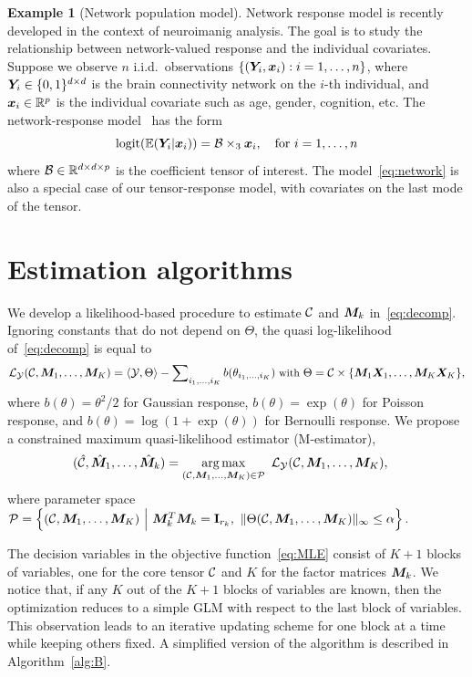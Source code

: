 \documentclass{article}
\theoremstyle{definition}
\theoremstyle{definition}
\newtheorem{example}{Example}
\begin{document}
\begin{example}[Network population model] 
Network response model is recently developed in the context of neuroimanig analysis. The goal is to study the relationship between network-valued response and the individual covariates. Suppose we observe $n$ i.i.d.\ observations $\{(\bm Y_i, \bm x_i): i=1,\ldots,n\}$, where $\bm Y_i\in\{0,1\}^{d\times d}$ is the brain connectivity network on the $i$-th individual, and $\bm x_i\in\mathbb{R}^p$ is the individual covariate such as age, gender, cognition, etc. The network-response model~\citep{rabusseau2016low} has the form
\begin{equation}\label{eq:network}
\text{logit}(\mathbb{E}(\bm Y_i|\bm x_i))=\mathcal{B}\times_3\bm x_i, \quad \text{for }i=1,\ldots,n
\end{equation}
where $\mathcal{B}\in \mathbb{R}^{d\times d\times p}$ is the coefficient tensor of interest. The model~\eqref{eq:network} is also a special case of our tensor-response model, with covariates on the last mode of the tensor. 
\end{example}

\section{Estimation algorithms}
We develop a likelihood-based procedure to estimate $\mathcal{C}$ and $\bm M_k$ in~\eqref{eq:decomp}. Ignoring constants that do not depend on $\Theta$, the quasi log-likelihood of~\eqref{eq:decomp} is equal to
\begin{equation}\label{eq:loglikelihood}
\small
\tL_{\tY}(\tC,\mM_1,\ldots,\mM_K)=\langle \tY, \Theta \rangle - \sum\nolimits_{i_1,\ldots,i_K} b(\theta_{i_1,\ldots,i_K})\ \text{with}\ \Theta=\tC\times\{\mM_1\mX_1,\ldots,\mM_K\mX_K\},
\end{equation}
where $b(\theta)=\theta^2/2$ for Gaussian response, $b(\theta)=\exp(\theta)$ for Poisson response, and $b(\theta)=\log(1+\exp(\theta))$ for Bernoulli response. We propose a constrained maximum quasi-likelihood estimator (M-estimator),
\begin{align} \label{eq:MLE} 
(\hat \tC, \hat \mM_1,\ldots,\hat \mM_k) &=\argmax_{(\tC,\mM_1,\ldots,\mM_K)\in \tP} \ \tL_{\tY}(\tC,\mM_1,\ldots,\mM_K),
\end{align}
where parameter space 
$
\tP=\left\{(\tC, \mM_1,\ldots,\mM_K) \ \Big| \ \mM_k^T\mM_k=\mathbf{I}_{r_k},\ \mnormSize{}{\Theta(\tC,\mM_1,\ldots,\mM_K)}\leq \alpha \right\}.
$


The decision variables in the objective function~\eqref{eq:MLE} consist of $K+1$ blocks of variables, one for the core tensor $\mathcal{C}$ and $K$ for the factor matrices $\bm M_k$. We notice that, if any $K$ out of the $K+1$ blocks of variables are known, then the optimization reduces to a simple GLM with respect to the last block of variables. This observation leads to an iterative updating scheme for one block at a time while keeping others fixed.  A simplified version of the algorithm is described in Algorithm~\ref{alg:B}. 
\end{document}
